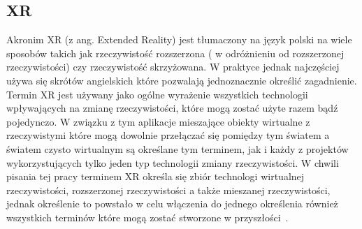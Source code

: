 	\subsection{XR}
	\label{subsec:xr}
	Akronim XR (z ang. Extended Reality) jest tłumaczony na język polski na wiele sposobów takich jak rzeczywistość rozszerzona ( w odróżnieniu od rozszerzonej rzeczywistości) czy rzeczywistość skrzyżowana. W praktyce jednak najczęściej używa się skrótów angielskich które pozwalają jednoznacznie określić zagadnienie. Termin XR jest używany jako ogólne wyrażenie wszystkich technologii wpływających na zmianę rzeczywistości, które mogą zostać użyte razem bądź pojedynczo. W związku z tym aplikacje mieszające obiekty wirtualne z rzeczywistymi które mogą dowolnie przełączać się pomiędzy tym światem a światem czysto wirtualnym są określane tym terminem, jak i każdy z projektów wykorzystujących tylko jeden typ technologii zmiany rzeczywistości. W chwili pisania tej pracy terminem XR określa się zbiór technologi wirtualnej rzeczywistości, rozszerzonej rzeczywistości a także mieszanej rzeczywistości, jednak określenie to powstało w celu włączenia do jednego określenia również wszystkich terminów które mogą zostać stworzone w przyszłości~\cite{terms}.
